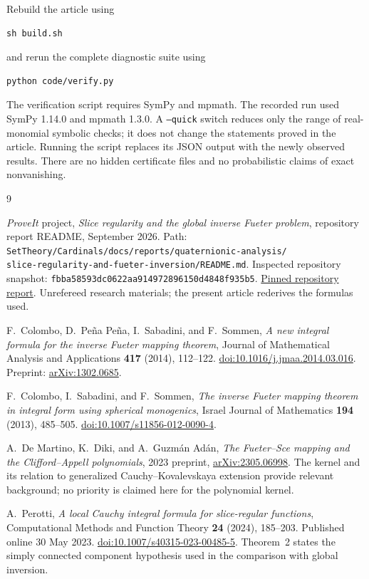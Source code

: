 \documentclass[11pt,a4paper]{article}
\numberwithin{equation}{section}
\theoremstyle{definition}
\theoremstyle{remark}
\begin{document}
Rebuild the article using
\begin{lstlisting}
sh build.sh
\end{lstlisting}
and rerun the complete diagnostic suite using
\begin{lstlisting}
python code/verify.py
\end{lstlisting}
The verification script requires SymPy and mpmath. The recorded run used
SymPy 1.14.0 and mpmath 1.3.0. A \texttt{--quick} switch reduces only the
range of real-monomial symbolic checks; it does not change the statements
proved in the article. Running the script replaces its JSON output with the
newly observed results. There are no hidden certificate files and no
probabilistic claims of exact nonvanishing.

\begin{thebibliography}{9}
\raggedright

\emph{ProveIt} project, \emph{Slice regularity and the global inverse Fueter
problem}, repository report README, September 2026.
Path: \texttt{SetTheory/Cardinals/docs/reports/quaternionic-analysis/}\\
\texttt{slice-regularity-and-fueter-inversion/README.md}.
Inspected repository snapshot:
\texttt{fbba58593dc0622aa914972896150d4848f935b5}.
\href{https://github.com/VladimirReshetnikov/ProveIt/tree/fbba58593dc0622aa914972896150d4848f935b5/SetTheory/Cardinals/docs/reports/quaternionic-analysis/slice-regularity-and-fueter-inversion}{Pinned repository report}.
Unrefereed research materials; the present article rederives the formulas used.

F.~Colombo, D.~Pe\~na Pe\~na, I.~Sabadini, and F.~Sommen,
\emph{A new integral formula for the inverse Fueter mapping theorem},
Journal of Mathematical Analysis and Applications \textbf{417} (2014),
112--122.
\href{https://doi.org/10.1016/j.jmaa.2014.03.016}{doi:10.1016/j.jmaa.2014.03.016}.
Preprint: \href{https://arxiv.org/abs/1302.0685}{arXiv:1302.0685}.

F.~Colombo, I.~Sabadini, and F.~Sommen,
\emph{The inverse Fueter mapping theorem in integral form using spherical
monogenics}, Israel Journal of Mathematics \textbf{194} (2013), 485--505.
\href{https://doi.org/10.1007/s11856-012-0090-4}{doi:10.1007/s11856-012-0090-4}.

A.~De Martino, K.~Diki, and A.~Guzm\'an Ad\'an,
\emph{The Fueter--Sce mapping and the Clifford--Appell polynomials},
2023 preprint, \href{https://arxiv.org/abs/2305.06998}{arXiv:2305.06998}.
The kernel and its relation to generalized Cauchy--Kovalevskaya extension
provide relevant background; no priority is claimed here for the polynomial
kernel.

A.~Perotti, \emph{A local Cauchy integral formula for slice-regular functions},
Computational Methods and Function Theory \textbf{24} (2024), 185--203.
Published online 30 May 2023.
\href{https://doi.org/10.1007/s40315-023-00485-5}{doi:10.1007/s40315-023-00485-5}.
Theorem~2 states the simply connected component hypothesis used in the
comparison with global inversion.

\end{thebibliography}
\end{document}
